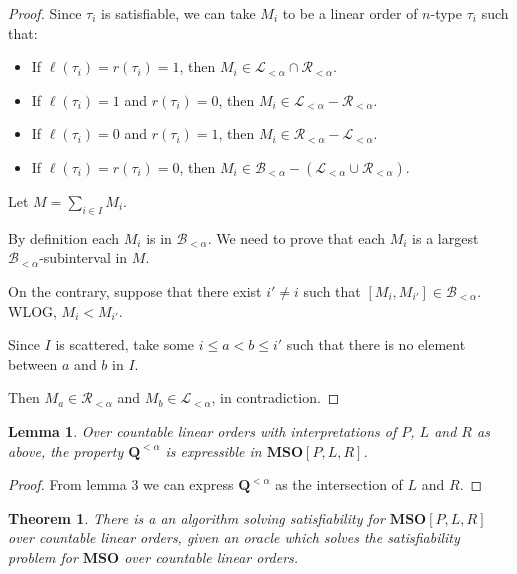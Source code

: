 \documentclass{article}
\newtheorem{theorem}{Theorem}
\newtheorem{lemma}{Lemma}
\newcommand{\mso}{\mathbf{MSO}}
\newcommand{\qq}{\mathbf{Q}}
\begin{document}
\begin{proof}
  Since $\tau_i$ is satisfiable, we can take $M_i$ to be a linear order of $n$-type
  $\tau_i$ such that:

  \begin{itemize}
    \item If $\ell(\tau_i) = r(\tau_i) = 1$, then $M_i \in \mathcal{L}_{< \alpha} \cap \mathcal{R}_{< \alpha}$.
    \item If $\ell(\tau_i) = 1$ and $r(\tau_i) = 0$, then $M_i \in \mathcal{L}_{< \alpha} - \mathcal{R}_{< \alpha}$.
    \item If $\ell(\tau_i) = 0$ and $r(\tau_i) = 1$, then $M_i \in \mathcal{R}_{< \alpha} - \mathcal{L}_{< \alpha}$.
    \item If $\ell(\tau_i) = r(\tau_i) = 0$, then $M_i \in \mathcal{B}_{< \alpha} - (\mathcal{L}_{< \alpha} \cup \mathcal{R}_{< \alpha})$.
  \end{itemize}

  Let $M = \sum_{i \in I} M_i$.

  By definition each $M_i$ is in $\mathcal{B}_{< \alpha}$. We need to prove
  that each $M_i$ is a largest $\mathcal{B}_{< \alpha}$-subinterval in $M$.

  On the contrary, suppose that there exist $i' \ne i$ such that $[M_i, M_{i'}] \in \mathcal{B}_{< \alpha}$.
  WLOG, $M_i < M_{i'}$.

  Since $I$ is scattered, take some $i \le a < b \le i'$ such that
  there is no element between $a$ and $b$ in $I$.

  Then $M_a \in \mathcal{R}_{< \alpha}$ and $M_b \in \mathcal{L}_{< \alpha}$, in contradiction.
\end{proof}

\begin{lemma}
  Over countable linear orders with interpretations of $P$, $L$ and $R$ as above, the property
  $\qq^{< \alpha}$ is expressible in $\mso[P, L, R]$.
\end{lemma}

\begin{proof}
  From lemma 3 we can express $\qq^{< \alpha}$ as the intersection
  of $L$ and $R$.
\end{proof}

\begin{theorem}
  There is a an algorithm solving satisfiability for $\mso[P, L, R]$ over countable linear orders,
  given an oracle which solves the satisfiability problem for $\mso$ over countable linear orders.
\end{theorem}
\end{document}
